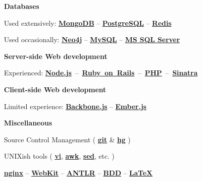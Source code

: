 \documentclass{tccv}
\begin{document}
{{\vspace{9pt}

\textsf{\textbf{Databases}}
	 
\hspace{3pt}%
Used extensively: %
     \href{http://www.mongodb.org}{\bf MongoDB} -- %
     \href{http://www.postgresql.org}{\bf PostgreSQL} -- %
     \href{http://redis.io}{\bf Redis}%

\hspace{3pt}%
Used occasionally: %
     \href{http://www.neo4j.org}{\bf Neo4j} -- %
     \href{http://www.mysql.com}{\bf MySQL} -- %
     \href{http://www.microsoft.com/en-us/sqlserver/default.aspx}{\bf MS SQL Server}%




\vspace{9pt}

\textsf{\textbf{Server-side Web development}}
 
\hspace{3pt}%
Experienced: %
\mbox{\href{http://nodejs.org}{\bf Node.js} -- %
     \href{http://rubyonrails.org}{\bf Ruby on Rails} -- %
     \href{http://php.net}{\bf PHP} -- %
     \href{http://www.sinatrarb.com}{\bf Sinatra}%
}



\vspace{9pt}

\textsf{\textbf{Client-side Web development}}
	 
\hspace{3pt}%
Limited experience: %
     \href{http://backbonejs.org}{\bf Backbone.js} -- %
     \href{http://emberjs.com}{\bf Ember.js}%



\vspace{9pt}

\textsf{\textbf{Miscellaneous}}

\hspace{3pt}%
Source Control Management (%
	\href{http://git-scm.com}{\bf git} \& %
	\href{http://www.selenic.com/mercurial/}{\bf hg}%
)%

\hspace{3pt}%
UNIXish tools (%
	\href{http://www.vim.org}{\bf vi}, %
	\href{http://awk.info}{\bf awk}, %
	\href{http://www.gnu.org/software/sed/}{\bf sed}, etc.%
)%

\hspace{3pt}%
	\href{http://nginx.org/en/}{\bf nginx} -- 
	\href{http://www.webkit.org}{\bf WebKit} -- 
	\href{http://www.antlr.org}{\bf ANTLR} -- 
	\href{http://en.wikipedia.org/wiki/Behavior-driven_development}{\bf BDD} -- 
	\href{http://www.latex-project.org}{\bf \LaTeX}




}}
\end{document}
